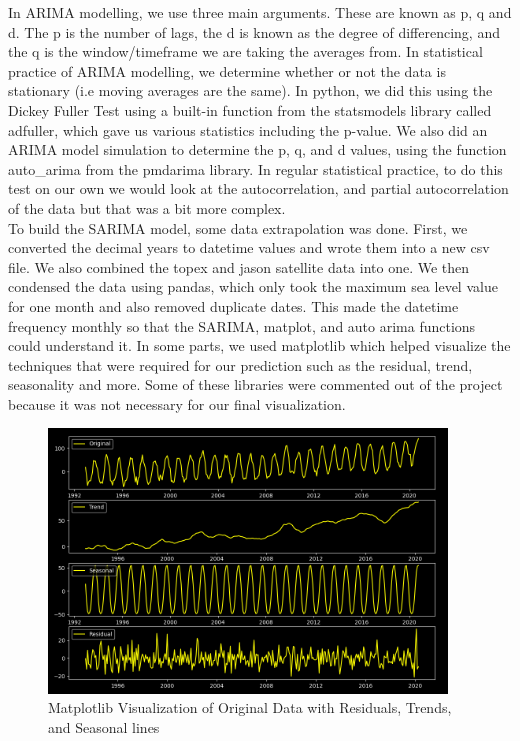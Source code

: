\documentclass[fontsize=11pt]{article}
\begin{document}
    In ARIMA modelling, we use three main arguments. These are known as p, q and d. The p is the number of lags, the d is known as the degree of differencing, and the q is the window/timeframe we are taking the averages from. In statistical practice of ARIMA modelling, we determine whether or not the data is stationary (i.e moving averages are the same). In python, we did this using the Dickey Fuller Test using a built-in function from the statsmodels library called adfuller, which gave us various statistics including the p-value. We also did an ARIMA model simulation to determine the p, q, and d values, using the function auto\_arima from the pmdarima library. In regular statistical practice, to do this test on our own we would look at the autocorrelation, and partial autocorrelation of the data but that was a bit more complex. \\

    To build the SARIMA model, some data extrapolation was done. First, we converted the decimal years to datetime values and wrote them into a new csv file. We also combined the topex and jason satellite data into one. We then condensed the data using pandas, which only took the maximum sea level value for one month and also removed duplicate dates. This made the datetime frequency monthly so that the SARIMA, matplot, and auto arima functions could understand it. In some parts, we used matplotlib which helped visualize the techniques that were required for our prediction such as the residual, trend, seasonality and more. Some of these libraries were commented out of the project because it was not necessary for our final visualization. \\

    \begin{figure}[h]
        \centering
        \includegraphics[width=300pt]{MatplotVisualization.png}
        \caption{Matplotlib Visualization of Original Data with Residuals, Trends, and Seasonal lines}
    \end{figure}
\end{document}
